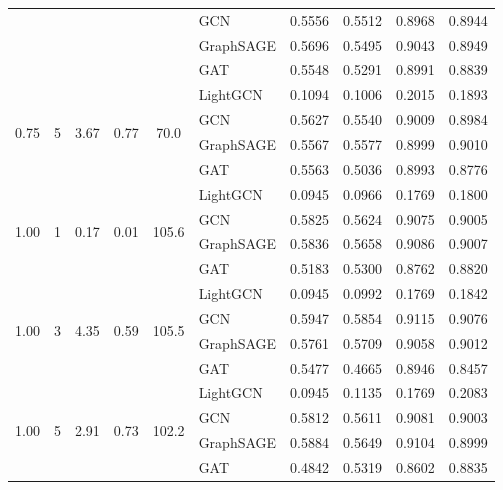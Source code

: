 {\begin{longtable}{cccccl rrrr}
 & & & & & GCN & 0.5556 & 0.5512 & 0.8968 & 0.8944 \\
 & & & & & GraphSAGE & 0.5696 & 0.5495 & 0.9043 & 0.8949 \\
 & & & & & GAT & 0.5548 & 0.5291 & 0.8991 & 0.8839 \\
\midrule
\multirow{4}{*}{0.75} & \multirow{4}{*}{5} & \multirow{4}{*}{3.67} & \multirow{4}{*}{0.77} & \multirow{4}{*}{70.0} & LightGCN & 0.1094 & 0.1006 & 0.2015 & 0.1893 \\
 & & & & & GCN & 0.5627 & 0.5540 & 0.9009 & 0.8984 \\
 & & & & & GraphSAGE & 0.5567 & 0.5577 & 0.8999 & 0.9010 \\
 & & & & & GAT & 0.5563 & 0.5036 & 0.8993 & 0.8776 \\
\midrule
\multirow{4}{*}{1.00} & \multirow{4}{*}{1} & \multirow{4}{*}{0.17} & \multirow{4}{*}{0.01} & \multirow{4}{*}{105.6} & LightGCN & 0.0945 & 0.0966 & 0.1769 & 0.1800 \\
 & & & & & GCN & 0.5825 & 0.5624 & 0.9075 & 0.9005 \\
 & & & & & GraphSAGE & 0.5836 & 0.5658 & 0.9086 & 0.9007 \\
 & & & & & GAT & 0.5183 & 0.5300 & 0.8762 & 0.8820 \\
\midrule
\multirow{4}{*}{1.00} & \multirow{4}{*}{3} & \multirow{4}{*}{4.35} & \multirow{4}{*}{0.59} & \multirow{4}{*}{105.5} & LightGCN & 0.0945 & 0.0992 & 0.1769 & 0.1842 \\
 & & & & & GCN & 0.5947 & 0.5854 & 0.9115 & 0.9076 \\
 & & & & & GraphSAGE & 0.5761 & 0.5709 & 0.9058 & 0.9012 \\
 & & & & & GAT & 0.5477 & 0.4665 & 0.8946 & 0.8457 \\
\midrule
\multirow{4}{*}{1.00} & \multirow{4}{*}{5} & \multirow{4}{*}{2.91} & \multirow{4}{*}{0.73} & \multirow{4}{*}{102.2} & LightGCN & 0.0945 & 0.1135 & 0.1769 & 0.2083 \\
 & & & & & GCN & 0.5812 & 0.5611 & 0.9081 & 0.9003 \\
 & & & & & GraphSAGE & 0.5884 & 0.5649 & 0.9104 & 0.8999 \\
 & & & & & GAT & 0.4842 & 0.5319 & 0.8602 & 0.8835 \\
\midrule
\end{longtable}
}

